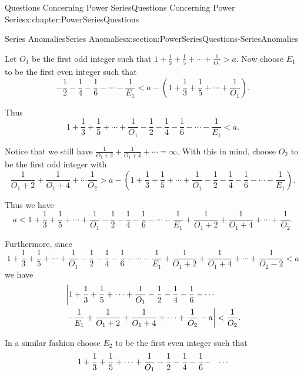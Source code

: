 \begin{chapterptx}{Questions Concerning Power Series}{}{Questions Concerning Power Series}{}{}{x:chapter:PowerSeriesQuestions}
\begin{sectionptx}{Series Anomalies}{}{Series Anomalies}{}{}{x:section:PowerSeriesQuestions-SeriesAnomalies}
		\par
		Let \(O_1\) be the first odd integer such that \(1+\frac{1}{3}+\frac{1}{5}+\cdots+\frac{1}{O_1}>a\). Now choose \(E_1\) to be the first even integer such that%
		\begin{equation*}
			-\frac{1}{2}-\frac{1}{4}-\frac{1}{6}-\cdots-\frac{1}{E_1} \lt a-\left(1+\frac{1}{3}+\frac{1}{5}+\cdots+\frac{1}{O_1}\right)\text{.}
		\end{equation*}
		\par
		Thus%
		\begin{equation*}
			1+\frac{1}{3}+\frac{1}{5}+\cdots+\frac{1}{O_1}-\frac{1}{2}-\frac{1}{4} - \frac{1}{6}-\cdots-\frac{1}{E_1}\lt a\text{.}
		\end{equation*}
		\par
		Notice that we still have \(\frac{1}{O_1+2}+\frac{1}{O_1+4}+\cdots=\infty\). With this in mind, choose \(O_2\) to be the first odd integer with%
		\begin{equation*}
			\frac{1}{O_1+2}+\frac{1}{O_1+4}+\cdots\frac{1}{O_2}>a-\left(1+\frac{1}{3}+ \frac{1}{5}+\cdots+\frac{1}{O_1}-\frac{1}{2}-\frac{1}{4}-\frac{1}{6}-\cdots- \frac{1}{E_1}\right)\text{.}
		\end{equation*}
		\par
		Thus we have%
		\begin{equation*}
			a\lt 1+\frac{1}{3}+\frac{1}{5}+\cdots+\frac{1}{O_1}-\frac{1}{2}-\frac{1}{4}- \frac{1}{6}-\cdots-\frac{1}{E_1}+\frac{1}{O_1+2}+\frac{1}{O_1+4}+\cdots+ \frac{1}{O_2}\text{.}
		\end{equation*}
		\par
		Furthermore, since%
		\begin{equation*}
			1+\frac{1}{3}+\frac{1}{5}+\cdots+\frac{1}{O_1}-\frac{1}{2}-\frac{1}{4}- \frac{1}{6}-\cdots-\frac{1}{E_1}+\frac{1}{O_1+2}+\frac{1}{O_1+4}+\cdots+ \frac{1}{O_2-2}\lt a
		\end{equation*}
		we have%
		\begin{align*}
			& \left|1+\frac{1}{3}+\frac{1}{5}+\cdots+\frac{1}{O_1}-\frac{1}{2}-\frac{1}{4}- \frac{1}{6}-\cdots\right.\\
			& \left.-\frac{1}{E_1}+\frac{1}{O_1+2}+\frac{1}{O_1+4}+\cdots+ \frac{1}{O_2}-a\right|< \frac{1}{O_2}\text{.}
		\end{align*}
		\par
		In a similar fashion choose \(E_2\) to be the first even integer such that%
		\begin{align*}
			1+\frac{1}{3}+\frac{1}{5}+\cdots\amp +\frac{1}{O_1}-\frac{1}{2}- \frac{1}{4}-\frac{1}{6}-\amp \cdots\\

\end{align*}
\end{sectionptx}
\end{chapterptx}
